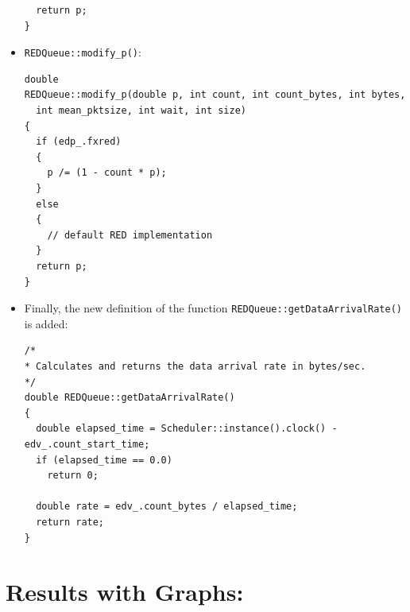 \documentclass[10pt]{report}
\begin{document}
\begin{itemize}
\begin{verbatim}
  return p;
}
\end{verbatim}


  \item \texttt{REDQueue::modify\_p()}:
\begin{verbatim}
double
REDQueue::modify_p(double p, int count, int count_bytes, int bytes, 
  int mean_pktsize, int wait, int size)
{
  if (edp_.fxred)
  {
    p /= (1 - count * p);
  }
  else
  {
    // default RED implementation
  }
  return p;
}
\end{verbatim}

  \item Finally, the new definition of the function \texttt{REDQueue::getDataArrivalRate()} is added:
\begin{verbatim}
/*
* Calculates and returns the data arrival rate in bytes/sec.
*/
double REDQueue::getDataArrivalRate()
{
  double elapsed_time = Scheduler::instance().clock() - edv_.count_start_time;
  if (elapsed_time == 0.0)
    return 0;
    
  double rate = edv_.count_bytes / elapsed_time;
  return rate;
}
\end{verbatim}


\end{itemize}

\section*{Results with Graphs:}
\end{document}
